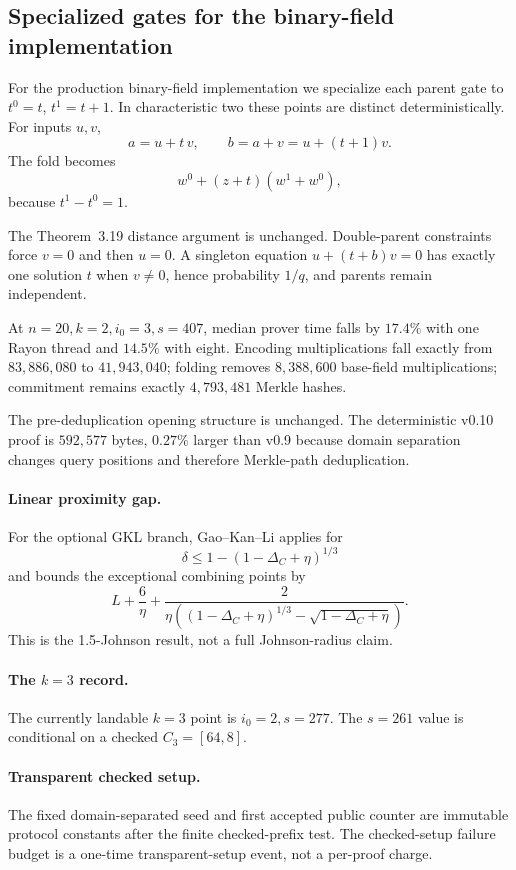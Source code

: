 \subsection{Specialized gates for the binary-field implementation}
\label{sec:specialized-gates}

For the production binary-field implementation we specialize each parent gate
to \(t^0=t\), \(t^1=t+1\). In characteristic two these points are distinct
deterministically. For inputs \(u,v\),
\[
a=u+t\,v,\qquad b=a+v=u+(t+1)v.
\]
The fold becomes
\[
w^0+(z+t)(w^1+w^0),
\]
because \(t^1-t^0=1\).

The Theorem~3.19 distance argument is unchanged. Double-parent constraints
force \(v=0\) and then \(u=0\). A singleton equation \(u+(t+b)v=0\) has
exactly one solution \(t\) when \(v\neq0\), hence probability \(1/q\), and
parents remain independent.

At \(n=20,k=2,i_0=3,s=407\), median prover time falls by \(17.4\%\) with one
Rayon thread and \(14.5\%\) with eight. Encoding multiplications fall exactly
from \(83{,}886{,}080\) to \(41{,}943{,}040\); folding removes
\(8{,}388{,}600\) base-field multiplications; commitment remains exactly
\(4{,}793{,}481\) Merkle hashes.

The pre-deduplication opening structure is unchanged. The deterministic v0.10
proof is \(592{,}577\) bytes, \(0.27\%\) larger than v0.9 because domain
separation changes query positions and therefore Merkle-path deduplication.

\paragraph{Linear proximity gap.}
For the optional GKL branch, Gao--Kan--Li applies for
\[
\delta\le1-(1-\Delta_C+\eta)^{1/3}
\]
and bounds the exceptional combining points by
\[
L+\frac{6}{\eta}+
\frac{2}{\eta((1-\Delta_C+\eta)^{1/3}-\sqrt{1-\Delta_C+\eta})}.
\]
This is the 1.5-Johnson result, not a full Johnson-radius claim.

\paragraph{The \(k=3\) record.}
The currently landable \(k=3\) point is \(i_0=2,s=277\). The \(s=261\) value
is conditional on a checked \(C_3=[64,8]\).

\paragraph{Transparent checked setup.}
The fixed domain-separated seed and first accepted public counter are immutable
protocol constants after the finite checked-prefix test. The checked-setup
failure budget is a one-time transparent-setup event, not a per-proof charge.
